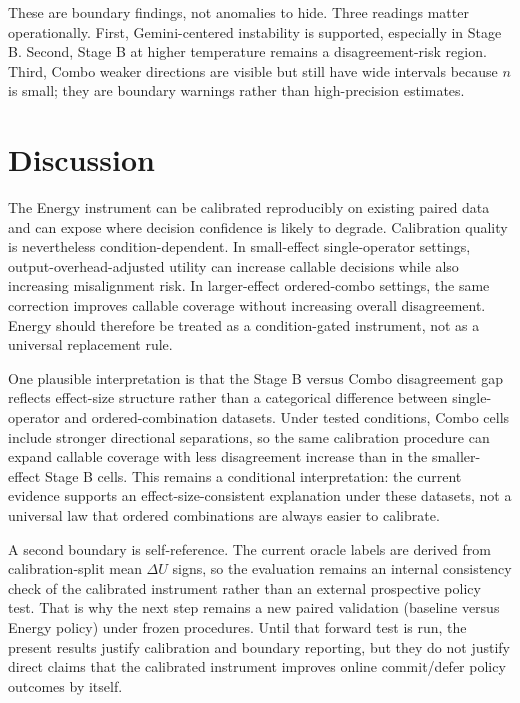 \documentclass[11pt,a4paper]{article}
\begin{document}
These are boundary findings, not anomalies to hide. Three readings matter operationally. First, Gemini-centered instability is supported, especially in Stage B. Second, Stage B at higher temperature remains a disagreement-risk region. Third, Combo weaker directions are visible but still have wide intervals because $n$ is small; they are boundary warnings rather than high-precision estimates.

\section{Discussion}
\label{sec:discussion}

The Energy instrument can be calibrated reproducibly on existing paired data and can expose where decision confidence is likely to degrade. Calibration quality is nevertheless condition-dependent. In small-effect single-operator settings, output-overhead-adjusted utility can increase callable decisions while also increasing misalignment risk. In larger-effect ordered-combo settings, the same correction improves callable coverage without increasing overall disagreement. Energy should therefore be treated as a condition-gated instrument, not as a universal replacement rule.

One plausible interpretation is that the Stage B versus Combo disagreement gap reflects effect-size structure rather than a categorical difference between single-operator and ordered-combination datasets. Under tested conditions, Combo cells include stronger directional separations, so the same calibration procedure can expand callable coverage with less disagreement increase than in the smaller-effect Stage B cells. This remains a conditional interpretation: the current evidence supports an effect-size-consistent explanation under these datasets, not a universal law that ordered combinations are always easier to calibrate.

A second boundary is self-reference. The current oracle labels are derived from calibration-split mean $\Delta U$ signs, so the evaluation remains an internal consistency check of the calibrated instrument rather than an external prospective policy test. That is why the next step remains a new paired validation (baseline versus Energy policy) under frozen procedures. Until that forward test is run, the present results justify calibration and boundary reporting, but they do not justify direct claims that the calibrated instrument improves online commit/defer policy outcomes by itself.
\end{document}
